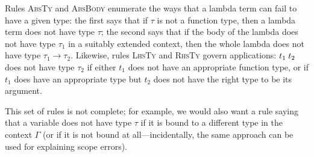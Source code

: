 \documentclass[sigplan, screen]{acmart}\settopmatter{printccs=false,printacmref=false}
\begin{document}
Rules \textsc{AbsTy\frownie{}} and \textsc{AbsBody\frownie{}}
enumerate the ways that a lambda term can fail to have a given type:
the first says that if $\tau$ is not a function type, then a lambda
term does not have type $\tau$; the second says that if the body of
the lambda does not have type $\tau_1$ in a suitably extended context,
then the whole lambda does not have type $\tau_1 \to \tau_2$.
Likewise, rules \textsc{LhsTy\frownie{}} and \textsc{RhsTy\frownie{}}
govern applications: ${t_1}\; {t_2}$ does not have type $\tau_2$ if
either $t_1$ does not have an appropriate function type, or if $t_1$
does have an appropriate type but $t_2$ does not have the right type
to be its argument.

This set of rules is not complete; for example, we would also want a
rule saying that a variable does not have type $\tau$ if it is bound
to a different type in the context $\Gamma$ (or if it is not bound at
all---incidentally, the same approach can be used for explaining scope
errors).
\end{document}

